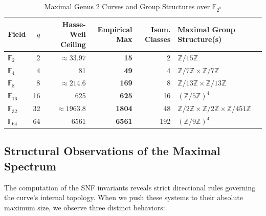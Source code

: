 \documentclass[11pt,letterpaper]{article}
\begin{document}
\begin{table}[h]
\centering
\caption{Maximal Genus 2 Curves and Group Structures over $\mathbb{F}_{2^k}$}
\label{tab:hasse_weil}
\begin{tabular}{lrrrrl}
\toprule
Field & $q$ & Hasse-Weil Ceiling & Empirical Max & Isom. Classes & Maximal Group Structure(s) \\
\midrule
$\mathbb{F}_2$ & 2 & $\approx 33.97$ & \textbf{15} & 2 & $\mathbb{Z}/15\mathbb{Z}$ \\
$\mathbb{F}_4$ & 4 & 81 & \textbf{49} & 4 & $\mathbb{Z}/7\mathbb{Z} \times \mathbb{Z}/7\mathbb{Z}$ \\
$\mathbb{F}_8$ & 8 & $\approx 214.6$ & \textbf{169} & 8 & $\mathbb{Z}/13\mathbb{Z} \times \mathbb{Z}/13\mathbb{Z}$ \\
$\mathbb{F}_{16}$ & 16 & 625 & \textbf{625} & 16 & $(\mathbb{Z}/5\mathbb{Z})^4$ \\
$\mathbb{F}_{32}$ & 32 & $\approx 1963.8$ & \textbf{1804} & 48 & $\mathbb{Z}/2\mathbb{Z} \times \mathbb{Z}/2\mathbb{Z} \times \mathbb{Z}/451\mathbb{Z}$ \\
$\mathbb{F}_{64}$ & 64 & 6561 & \textbf{6561} & 192 & $(\mathbb{Z}/9\mathbb{Z})^4$ \\
\bottomrule
\end{tabular}
\end{table}

\subsection{Structural Observations of the Maximal Spectrum}
The computation of the SNF invariants reveals strict directional rules governing the curve's internal topology. When we push these systems to their absolute maximum size, we observe three distinct behaviors:
\end{document}
